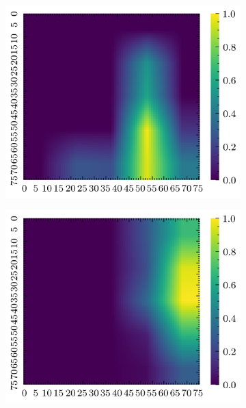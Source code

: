 \documentclass[../document.tex]{subfiles}
\begin{document}
\begin{figure}[H]
\begin{subfigure}[b]{0.19\textwidth}
        \includegraphics[width=\linewidth]{../img/5/quarry/false_positive/grad-cam-2d-2.png}
    \end{subfigure}
    \begin{subfigure}[b]{0.19\textwidth}
        \includegraphics[width=\linewidth]{../img/5/quarry/false_positive/grad-cam-2d-3.png}
    \end{subfigure}  
    \begin{subfigure}[b]{0.19\textwidth}

\end{subfigure}
\end{figure}
\end{document}
